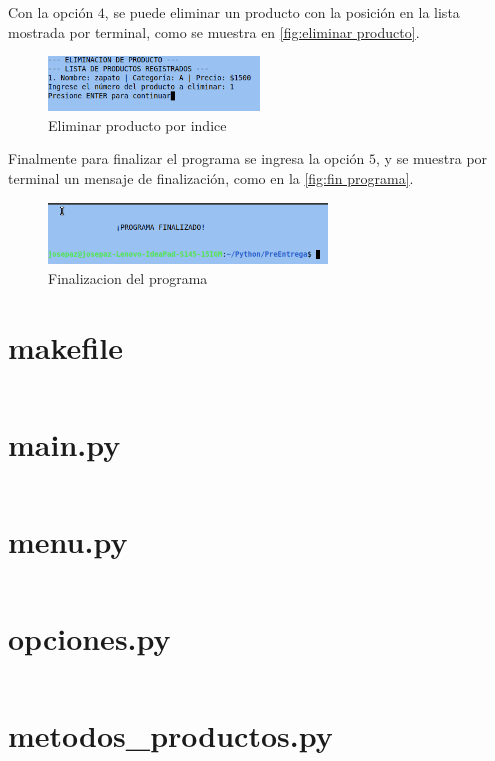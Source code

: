 \documentclass[12pt]{article}
\begin{document}
Con la opción $4$, se puede eliminar un producto con la posición en la lista mostrada por terminal, como se muestra en \autoref{fig:eliminar producto}.

\begin{figure}[H]
	\centering
	\setlength{\fboxrule}{0pt}
	\includegraphics[width=0.5\textwidth]{img5.png}
	\caption{Eliminar producto por indice}
	\label{fig:eliminar producto}
\end{figure} 

Finalmente para finalizar el programa se ingresa la opción $5$, y se muestra por terminal un mensaje de finalización, como en la \autoref{fig:fin programa}.
\begin{figure}[H]
	\centering
	\setlength{\fboxrule}{0pt}
	\includegraphics[width=0.66\textwidth]{img6.png}
	\caption{Finalizacion del programa}
	\label{fig:fin programa}
\end{figure} 

\section{makefile}
\inputminted[fontsize=\small]{make}{makefile}

\section{main.py}
\inputminted[fontsize=\small, breaklines=true]{python}{main.py}

\section{menu.py}
\inputminted[fontsize=\small, breaklines=true]{python}{menu.py}

\section{opciones.py}
\inputminted[fontsize=\small, breaklines=true]{python}{opciones.py}

\section{metodos\_productos.py}
\inputminted[fontsize=\small, breaklines=true]{python}{metodos_productos.py}
\end{document}
